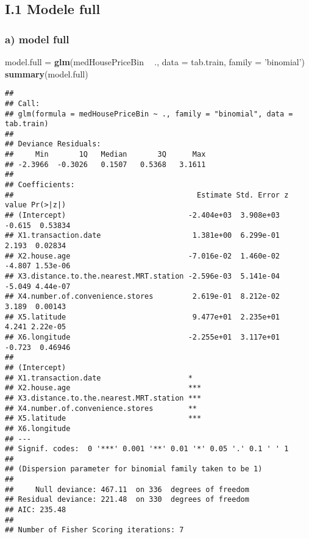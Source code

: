 \documentclass[
]{article}
\newenvironment{Shaded}{\begin{snugshade}}{\end{snugshade}}
\newcommand{\DataTypeTok}[1]{\textcolor[rgb]{0.13,0.29,0.53}{#1}}
\newcommand{\KeywordTok}[1]{\textcolor[rgb]{0.13,0.29,0.53}{\textbf{#1}}}
\newcommand{\NormalTok}[1]{#1}
\newcommand{\OperatorTok}[1]{\textcolor[rgb]{0.81,0.36,0.00}{\textbf{#1}}}
\newcommand{\StringTok}[1]{\textcolor[rgb]{0.31,0.60,0.02}{#1}}
\begin{document}
\hypertarget{i.1-modele-full}{%
\subsection{I.1 Modele full}\label{i.1-modele-full}}

\hypertarget{a-model-full}{%
\subsubsection{a) model full}\label{a-model-full}}

\begin{Shaded}
\begin{Highlighting}[]
\NormalTok{model.full =}\StringTok{ }\KeywordTok{glm}\NormalTok{(medHousePriceBin }\OperatorTok{~}\StringTok{ }\NormalTok{., }\DataTypeTok{data =}\NormalTok{ tab.train, }\DataTypeTok{family =} \StringTok{'binomial'}\NormalTok{)}
\KeywordTok{summary}\NormalTok{(model.full)}
\end{Highlighting}
\end{Shaded}

\begin{verbatim}
## 
## Call:
## glm(formula = medHousePriceBin ~ ., family = "binomial", data = tab.train)
## 
## Deviance Residuals: 
##     Min       1Q   Median       3Q      Max  
## -2.3966  -0.3026   0.1507   0.5368   3.1611  
## 
## Coefficients:
##                                          Estimate Std. Error z value Pr(>|z|)
## (Intercept)                            -2.404e+03  3.908e+03  -0.615  0.53834
## X1.transaction.date                     1.381e+00  6.299e-01   2.193  0.02834
## X2.house.age                           -7.016e-02  1.460e-02  -4.807 1.53e-06
## X3.distance.to.the.nearest.MRT.station -2.596e-03  5.141e-04  -5.049 4.44e-07
## X4.number.of.convenience.stores         2.619e-01  8.212e-02   3.189  0.00143
## X5.latitude                             9.477e+01  2.235e+01   4.241 2.22e-05
## X6.longitude                           -2.255e+01  3.117e+01  -0.723  0.46946
##                                           
## (Intercept)                               
## X1.transaction.date                    *  
## X2.house.age                           ***
## X3.distance.to.the.nearest.MRT.station ***
## X4.number.of.convenience.stores        ** 
## X5.latitude                            ***
## X6.longitude                              
## ---
## Signif. codes:  0 '***' 0.001 '**' 0.01 '*' 0.05 '.' 0.1 ' ' 1
## 
## (Dispersion parameter for binomial family taken to be 1)
## 
##     Null deviance: 467.11  on 336  degrees of freedom
## Residual deviance: 221.48  on 330  degrees of freedom
## AIC: 235.48
## 
## Number of Fisher Scoring iterations: 7
\end{verbatim}
\end{document}
